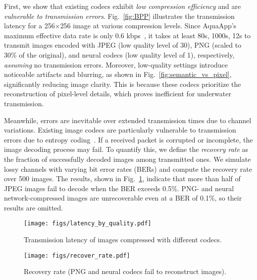  First, we show that existing codecs exhibit \textit{low compression efficiency} and are \textit{vulnerable to transmission errors}.
Fig.~\ref{fig:BPP} illustrates the transmission latency for a 256$\times$256 image at various compression levels.
Since AquaApp's maximum effective data rate is only 0.6 kbps~\cite{chen2022underwater}, it takes at least 80s, 1000s, 12s to transmit images
encoded with JPEG (low quality level of 30), PNG (scaled to 30\% of the original), and neural codecs (low quality level of 1), respectively, \textit{assuming} no transmission errors. Moreover, low-quality settings introduce noticeable artifacts and blurring, as shown in Fig.~\ref{fig:semantic_vs_pixel}, significantly reducing image clarity. This is because these codecs prioritize
the reconstruction of pixel-level details, which proves inefficient for underwater
transmission.





Meanwhile,
errors are inevitable over extended transmission times due to channel variations. Existing image codecs are particularly vulnerable to transmission errors due to entropy coding~\cite{huffman1952method,witten1987arithmetic}.
If a received packet is corrupted or incomplete, the image decoding process
may fail.
To quantify this, we define the \textit{recovery rate} as the
fraction of successfully decoded images among transmitted ones.
We simulate lossy channels with varying bit error rates (BERs) and compute
the recovery rate over 500 images.
The results, shown in Fig.~\ref{fig:recovery}, indicate that more than half
of JPEG images fail to decode when the BER exceeds 0.5\%.
PNG- and neural network-compressed images are unrecoverable even at a BER
of 0.1\%, so their results are omitted.






\begin{figure}[t]
    \centering
    \begin{minipage}[b]{0.23\textwidth}
        \centering
        \texttt{[image: figs/latency\_by\_quality.pdf]}
        \caption{Transmission laten\-cy of images compressed with different codecs.}
        \label{fig:BPP}
    \end{minipage}\hfill
    \begin{minipage}[b]{0.23\textwidth}
        \centering
        \texttt{[image: figs/recover\_rate.pdf]}
        \caption{Recovery rate (PNG and neural codecs fail to reconstruct images).}
        \label{fig:recovery}
    \end{minipage}
\end{figure}


